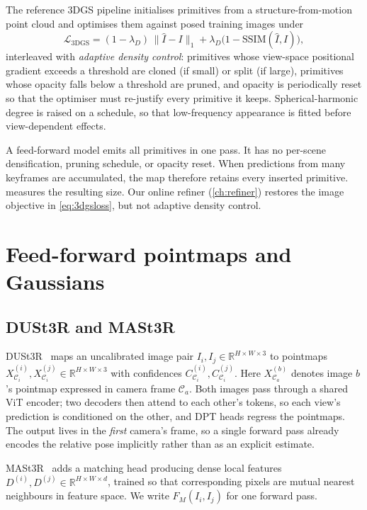The reference 3DGS pipeline initialises primitives from a structure-from-motion
point cloud and optimises them against posed training images under
\begin{equation}
\mathcal{L}_{\text{3DGS}} = (1-\lambda_D)\,\lVert\hat{I}-I\rVert_1
      + \lambda_D\bigl(1-\mathrm{SSIM}(\hat{I},I)\bigr),
\label{eq:3dgsloss}
\end{equation}
interleaved with \emph{adaptive density control}: primitives whose view-space
positional gradient exceeds a threshold are cloned (if small) or split (if
large), primitives whose opacity falls below a threshold are pruned, and
opacity is periodically reset so that the optimiser must re-justify every
primitive it keeps. Spherical-harmonic degree is raised on a schedule, so that
low-frequency appearance is fitted before view-dependent effects.

A feed-forward model emits all primitives in one pass. It has no per-scene
densification, pruning schedule, or opacity reset. When predictions from many
keyframes are accumulated, the map therefore retains every inserted
primitive.  measures the resulting size.
Our online refiner (\cref{ch:refiner}) restores the image objective in
\cref{eq:3dgsloss}, but not adaptive density control.

\section{Feed-forward pointmaps and Gaussians}
\label{sec:bg:feedforward}

\subsection{DUSt3R and MASt3R}

DUSt3R~\cite{wang2024dust3r} maps an uncalibrated image pair
$I_i,I_j\in\mathbb{R}^{H\times W\times3}$ to pointmaps
$X_{\mathcal C_i}^{(i)},X_{\mathcal C_i}^{(j)}
\in\mathbb{R}^{H\times W\times3}$ with confidences
$C_{\mathcal C_i}^{(i)},C_{\mathcal C_i}^{(j)}$. Here
$X_{\mathcal C_a}^{(b)}$ denotes image $b$'s pointmap expressed in camera
frame $\mathcal C_a$. Both images pass through a shared ViT encoder; two
decoders then attend to each other's tokens, so each view's prediction is
conditioned on the other, and DPT heads regress the pointmaps. The output lives
in the \emph{first} camera's frame, so a single forward pass already encodes
the relative pose implicitly rather than as an explicit estimate.

MASt3R~\cite{leroy2024mast3r} adds a matching head producing dense local
features $D^{(i)},D^{(j)}\in\mathbb{R}^{H\times W\times d}$, trained so that
corresponding pixels are mutual nearest neighbours in feature space. We write
$F_M(I_i,I_j)$ for one forward pass.

